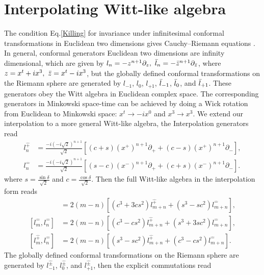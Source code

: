\documentclass[%
 reprint,
superscriptaddress,
 amsmath,amssymb,
 aps,
]{revtex4-2}
\begin{document}
\section{Interpolating  Witt-like algebra}
\label{sec_Witt-like}
The condition Eq.\eqref{Killing} for invariance under infinitesimal conformal transformations in Euclidean two dimensions gives Cauchy–Riemann equations \cite{Francesco, Blumenhagen}. In general, conformal generators Euclidean two dimensions are infinity dimensional, which are given by $l_n=-z^{n+1}\partial_{z},~\Bar{l}_n=-\Bar{z}^{n+1}\partial_{\Bar{z}}$, where $z=x^t+ix^3,~ \Bar{z}=x^t-ix^3$, but the globally defined conformal transformations on the Riemann sphere are generated by $l_{-1}$, $l_{0}$, $l_{+1}$, $\Bar{l}_{-1}$, $\Bar{l}_{0}$, and $\Bar{l}_{+1}$. These generators obey the Witt algebra in Euclidean complex space. The corresponding generators in Minkowski space-time can be achieved by doing a Wick rotation from Euclidean to Minkowski space: $x^t\longrightarrow -ix^{0}$ and $x^3\longrightarrow x^{3}$. We extend our interpolation to a more general Witt-like algebra, the Interpolation generators read
\begin{align}
    l^{\hat{+}}_n&=\frac{-i(-i\sqrt{2})^{n+1}}{\sqrt{2}}\left[(c+s)\left(x^{+}\right)^{n+1}\partial_{+}+(c-s)\left(x^{+}\right)^{n+1}\partial_{-}\right],\\
    l^{\hat{-}}_n&=\frac{-i(-i\sqrt{2})^{n+1}}{\sqrt{2}}\left[(s-c)\left(x^{-}\right)^{n+1}\partial_{+}+(c+s)\left(x^{-}\right)^{n+1}\partial_{-}\right].
\end{align}
where $s=\frac{\sin{\delta}}{\sqrt{2}}$ and $c=\frac{\cos{\delta}}{\sqrt{2}}$. Then the full Witt-like algebra in the interpolation form reads
\begin{align}
    [l^{\hat{+}}_m,l^{\hat{+}}_n]&=2(m-n)[(c^{3}+3cs^{2})l^{\hat{+}}_{m+n}+(s^{3}-sc^{2})l^{\hat{-}}_{m+n}],\\
    [l^{\hat{-}}_m,l^{\hat{-}}_n]&=2(m-n)[(c^{3}-cs^{2})l^{\hat{+}}_{m+n}+(s^{3}+3sc^{2})l^{\hat{-}}_{m+n}],\\
    [l^{\hat{+}}_m,l^{\hat{-}}_n]&=2(m-n)[(s^{3}-sc^{2})l^{\hat{+}}_{m+n}+(c^{3}-cs^{2})l^{\hat{-}}_{m+n}].
\end{align}
The globally defined conformal transformations on the Riemann sphere are generated by $l^{\hat{\pm}}_{-1}$, $l^{\hat{\pm}}_{0}$, and $l^{\hat{\pm}}_{+1}$, then the explicit commutations read
\end{document}
